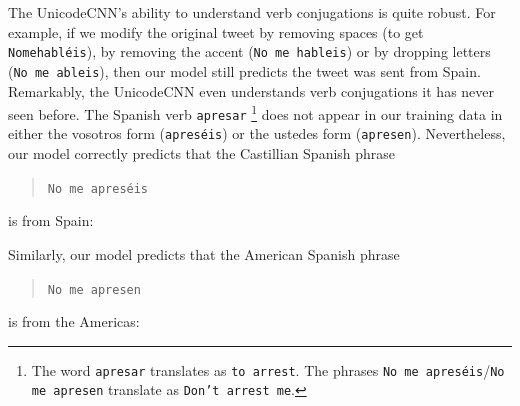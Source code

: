 \documentclass[sigconf,anonymous,review]{acmart}
\newcommand{\str}[1]{\texttt{#1}}
\begin{document}
\begin{description}
The UnicodeCNN's ability to understand verb conjugations is quite robust.
For example, if we modify the original tweet by removing spaces (to get \str{Nomehabl\'eis}),
by removing the accent (\str{No me hableis})
or by dropping letters (\str{No me ableis}),
then our model still predicts the tweet was sent from Spain.
%
%
Remarkably, the UnicodeCNN even understands verb conjugations it has never seen before.
The Spanish verb \str{apresar}%
\footnote{
    The word \str{apresar} translates as \str{to arrest}. 
    The phrases \str{No me apres\'eis}/\str{No me apresen} translate as \str{Don't arrest me}.
}
does not appear in our training data in either the vosotros form (\str{apres\'eis}) or the ustedes form (\str{apresen}).
Nevertheless, our model correctly predicts that the Castillian Spanish phrase
\begin{quote}
    \str{No me apres\'eis}%
\end{quote}
is from Spain:

\noindent

\noindent
Similarly, our model predicts that the American Spanish phrase 
\begin{quote}
    \str{No me apresen}
\end{quote}
is from the Americas:

\noindent


\end{description}
\end{document}
